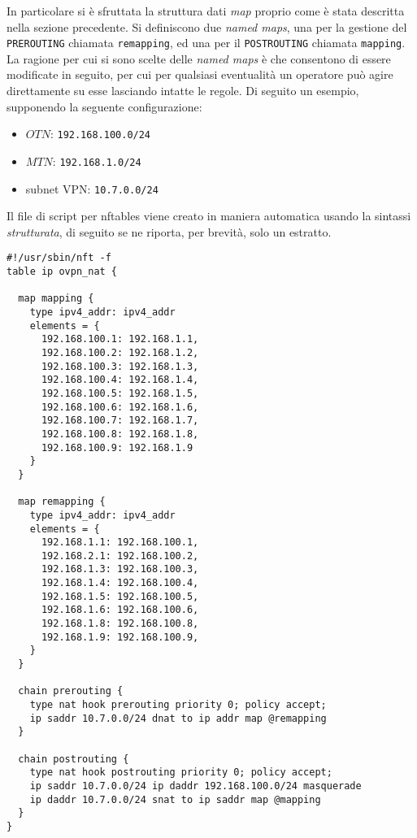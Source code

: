 In particolare si è sfruttata la struttura dati \textit{map} proprio come è stata
descritta nella sezione precedente. Si definiscono due \textit{named maps},
una per la gestione
del \texttt{PREROUTING} chiamata \texttt{remapping}, ed una per il \texttt{POSTROUTING}
chiamata \texttt{mapping}. La ragione per cui si sono scelte delle \textit{named maps}
è che consentono di essere modificate in seguito, per cui per qualsiasi eventualità
un operatore può agire direttamente su esse lasciando intatte le regole.
Di seguito un esempio, supponendo la seguente configurazione:
\begin{itemize}
  \item $OTN$: \texttt{192.168.100.0/24}
  \item $MTN$: \texttt{192.168.1.0/24}
  \item subnet VPN: \texttt{10.7.0.0/24}
\end{itemize}
Il file di script per nftables viene creato in maniera automatica usando la sintassi
\textit{strutturata},
di seguito se ne riporta, per brevità, solo un estratto.
\begin{verbatim}
#!/usr/sbin/nft -f
table ip ovpn_nat {

  map mapping {
    type ipv4_addr: ipv4_addr
    elements = {
      192.168.100.1: 192.168.1.1,
      192.168.100.2: 192.168.1.2,
      192.168.100.3: 192.168.1.3,
      192.168.100.4: 192.168.1.4,
      192.168.100.5: 192.168.1.5,
      192.168.100.6: 192.168.1.6,
      192.168.100.7: 192.168.1.7,
      192.168.100.8: 192.168.1.8,
      192.168.100.9: 192.168.1.9      
    }
  }

  map remapping {
    type ipv4_addr: ipv4_addr
    elements = {
      192.168.1.1: 192.168.100.1,
      192.168.2.1: 192.168.100.2,
      192.168.1.3: 192.168.100.3,
      192.168.1.4: 192.168.100.4,
      192.168.1.5: 192.168.100.5,
      192.168.1.6: 192.168.100.6,
      192.168.1.8: 192.168.100.8,
      192.168.1.9: 192.168.100.9,
    }
  }

  chain prerouting {
    type nat hook prerouting priority 0; policy accept;
    ip saddr 10.7.0.0/24 dnat to ip addr map @remapping
  }

  chain postrouting {
    type nat hook postrouting priority 0; policy accept;
    ip saddr 10.7.0.0/24 ip daddr 192.168.100.0/24 masquerade
    ip daddr 10.7.0.0/24 snat to ip saddr map @mapping
  }
}
\end{verbatim}
